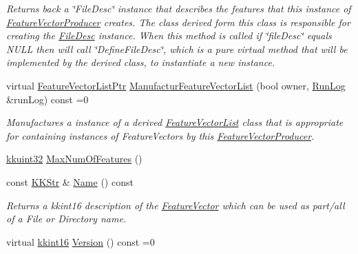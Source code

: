 \begin{DoxyCompactItemize}
\begin{DoxyCompactList}\small\item\em Returns back a \char`\"{}\+File\+Desc\char`\"{} instance that describes the features that this instance of \textquotesingle{}\hyperlink{class_k_k_m_l_l_1_1_feature_vector_producer}{Feature\+Vector\+Producer}\textquotesingle{} creates. The class derived form this class is responsible for creating the \hyperlink{class_k_k_m_l_l_1_1_file_desc}{File\+Desc} instance. When this method is called if \char`\"{}file\+Desc\char`\"{} equals N\+U\+LL then will call \char`\"{}\+Define\+File\+Desc\char`\"{}, which is a pure virtual method that will be implemented by the derived class, to instantiate a new instance. \end{DoxyCompactList}\item 
virtual \hyperlink{namespace_k_k_m_l_l_acf2ba92a3cf03e2b19674b24ff488ef6}{Feature\+Vector\+List\+Ptr} \hyperlink{class_k_k_m_l_l_1_1_feature_vector_producer_adc6163ba80510ea41c6047172db93ac0}{Manufactur\+Feature\+Vector\+List} (bool owner, \hyperlink{class_k_k_b_1_1_run_log}{Run\+Log} \&run\+Log) const  =0
\begin{DoxyCompactList}\small\item\em Manufactures a instance of a derived \textquotesingle{}\hyperlink{class_k_k_m_l_l_1_1_feature_vector_list}{Feature\+Vector\+List}\textquotesingle{} class that is appropriate for containing instances of Feature\+Vectors by this \hyperlink{class_k_k_m_l_l_1_1_feature_vector_producer}{Feature\+Vector\+Producer}. \end{DoxyCompactList}\item 
\hyperlink{namespace_k_k_b_af8d832f05c54994a1cce25bd5743e19a}{kkuint32} \hyperlink{class_k_k_m_l_l_1_1_feature_vector_producer_a86ea45d1107d227351f7484a86889b29}{Max\+Num\+Of\+Features} ()
\item 
const \hyperlink{class_k_k_b_1_1_k_k_str}{K\+K\+Str} \& \hyperlink{class_k_k_m_l_l_1_1_feature_vector_producer_a8133fa34340220252f409c0cc607322a}{Name} () const 
\begin{DoxyCompactList}\small\item\em Returns a kkint16 description of the \hyperlink{class_k_k_m_l_l_1_1_feature_vector}{Feature\+Vector} which can be used as part/all of a File or Directory name. \end{DoxyCompactList}\item 
virtual \hyperlink{namespace_k_k_b_a93809780ee294124dda4c23069f41248}{kkint16} \hyperlink{class_k_k_m_l_l_1_1_feature_vector_producer_a8e2f54e185b2fb5de854d9978b4fbac8}{Version} () const  =0
\end{DoxyCompactItemize}
